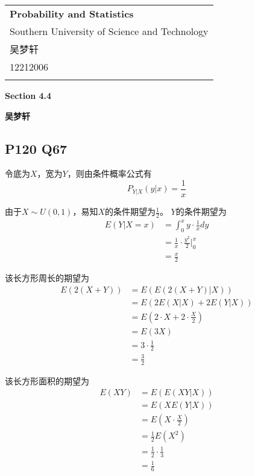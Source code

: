 \documentclass[a4paper,12pt]{ctexart}
\begin{document}
\thispagestyle{empty} %

\begin{tabular}{p{15.5cm}}
{\large \bf Probability and Statistics} \\
Southern University of Science and Technology \\ 吴梦轩 \\ 12212006 \\
\hline
\\
\end{tabular}

\vspace*{0.3cm} %

\begin{center}
	{\Large \bf Section 4.4}
	\vspace{2mm}

	{\bf 吴梦轩}
		
\end{center}  

\vspace{0.4cm}

\subsection*{P120 Q67}

令底为$X$，宽为$Y$，则由条件概率公式有
\begin{equation*}
	P_{Y|X}(y|x) = \frac{1}{x}
\end{equation*}

由于$X \sim U(0,1)$，易知$X$的条件期望为$\frac{1}{2}$。
$Y$的条件期望为
\begin{align*}
	E(Y|X = x) &= \int_{0}^{x} y \cdot \frac{1}{x} dy \\
	&= \frac{1}{x} \cdot \frac{y^2}{2} \bigg|_{0}^{x} \\
	&= \frac{x}{2} 
\end{align*}

该长方形周长的期望为
\begin{align*}
	E(2(X+Y)) &= E(E(2(X+Y)|X)) \\
	&= E(2E(X|X) + 2E(Y|X)) \\
	&= E\left(2 \cdot X + 2 \cdot \frac{X}{2}\right) \\
	&= E(3X) \\
	&= 3 \cdot \frac{1}{2} \\
	&= \frac{3}{2}
\end{align*}

该长方形面积的期望为
\begin{align*}
	E(XY) &= E(E(XY|X)) \\
	&= E(XE(Y|X)) \\
	&= E\left(X \cdot \frac{X}{2}\right) \\
	&= \frac{1}{2} E(X^2) \\
	&= \frac{1}{2} \cdot \frac{1}{3} \\
	&= \frac{1}{6}
\end{align*}
\end{document}
